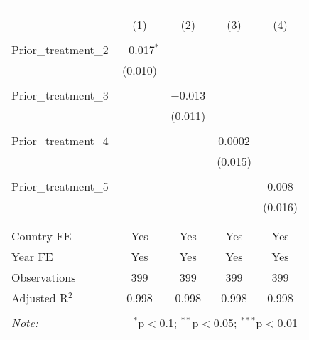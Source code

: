 
\begin{table}[!htbp] \centering 
  \caption{} 
  \label{} 
\begin{tabular}{@{\extracolsep{5pt}}lcccc} 
\\[-1.8ex]\hline 
\hline \\[-1.8ex] 
\\[-1.8ex] & (1) & (2) & (3) & (4)\\ 
\hline \\[-1.8ex] 
 Prior\_treatment\_2 & $-$0.017$^{*}$ &  &  &  \\ 
  & (0.010) &  &  &  \\ 
  & & & & \\ 
 Prior\_treatment\_3 &  & $-$0.013 &  &  \\ 
  &  & (0.011) &  &  \\ 
  & & & & \\ 
 Prior\_treatment\_4 &  &  & 0.0002 &  \\ 
  &  &  & (0.015) &  \\ 
  & & & & \\ 
 Prior\_treatment\_5 &  &  &  & 0.008 \\ 
  &  &  &  & (0.016) \\ 
  & & & & \\ 
\hline \\[-1.8ex] 
Country FE & Yes & Yes & Yes & Yes \\ 
Year FE & Yes & Yes & Yes & Yes \\ 
Observations & 399 & 399 & 399 & 399 \\ 
Adjusted R$^{2}$ & 0.998 & 0.998 & 0.998 & 0.998 \\ 
\hline 
\hline \\[-1.8ex] 
\textit{Note:}  & \multicolumn{4}{r}{$^{*}$p$<$0.1; $^{**}$p$<$0.05; $^{***}$p$<$0.01} \\ 
\end{tabular} 
\end{table} 
